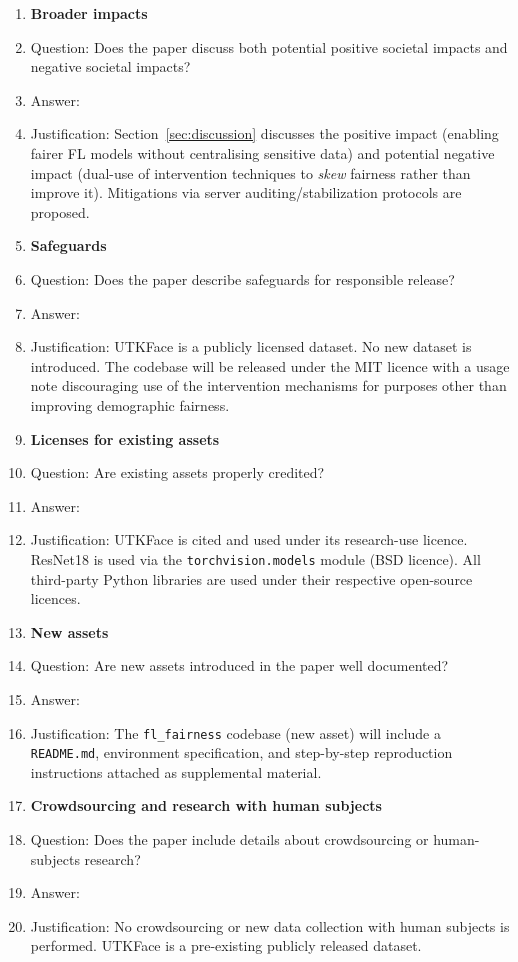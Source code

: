 \begin{enumerate}
\item {\bf Broader impacts}
    \item[] Question: Does the paper discuss both potential positive societal impacts and negative societal impacts?
    \item[] Answer: \answerYes{}
    \item[] Justification: Section~\ref{sec:discussion} discusses the positive impact (enabling fairer FL models without centralising sensitive data) and potential negative impact (dual-use of intervention techniques to \emph{skew} fairness rather than improve it). Mitigations via server auditing/stabilization protocols are proposed.

\item {\bf Safeguards}
    \item[] Question: Does the paper describe safeguards for responsible release?
    \item[] Answer: \answerYes{}
    \item[] Justification: UTKFace is a publicly licensed dataset. No new dataset is introduced. The codebase will be released under the MIT licence with a usage note discouraging use of the intervention mechanisms for purposes other than improving demographic fairness.

\item {\bf Licenses for existing assets}
    \item[] Question: Are existing assets properly credited?
    \item[] Answer: \answerYes{}
    \item[] Justification: UTKFace is cited and used under its research-use licence. ResNet18 is used via the \texttt{torchvision.models} module (BSD licence). All third-party Python libraries are used under their respective open-source licences.

\item {\bf New assets}
    \item[] Question: Are new assets introduced in the paper well documented?
    \item[] Answer: \answerYes{}
    \item[] Justification: The \texttt{fl\_fairness} codebase (new asset) will include a \texttt{README.md}, environment specification, and step-by-step reproduction instructions attached as supplemental material.

\item {\bf Crowdsourcing and research with human subjects}
    \item[] Question: Does the paper include details about crowdsourcing or human-subjects research?
    \item[] Answer: \answerNA{}
    \item[] Justification: No crowdsourcing or new data collection with human subjects is performed. UTKFace is a pre-existing publicly released dataset.


\end{enumerate}
